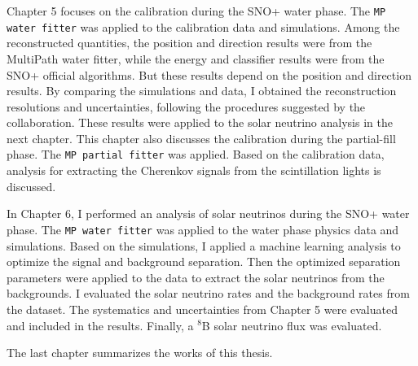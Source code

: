 Chapter 5 focuses on the calibration during the SNO+ water phase. The \texttt{MP water fitter} was applied to the calibration data and simulations. Among the reconstructed quantities, the position and direction results were from the MultiPath water fitter, while the energy and classifier results were from the SNO+ official algorithms. But these results depend on the position and direction results. By comparing the simulations and data, I obtained the reconstruction resolutions and uncertainties, following the procedures suggested by the collaboration. These results were applied to the solar neutrino analysis in the next chapter. This chapter also discusses the calibration during the partial-fill phase. The \texttt{MP partial fitter} was applied. Based on the calibration data, analysis for extracting the Cherenkov signals from the scintillation lights is discussed.

In Chapter 6, I performed an analysis of solar neutrinos during the SNO+ water phase. The \texttt{MP water fitter} was applied to the water phase physics data and simulations. Based on the simulations, I applied a machine learning analysis to optimize the signal and background separation. Then the optimized separation parameters were applied to the data to extract the solar neutrinos from the backgrounds. I evaluated the solar neutrino rates and the background rates from the dataset. The systematics and uncertainties from Chapter 5 were evaluated and included in the results. Finally, a $^8$B solar neutrino flux was evaluated.

The last chapter summarizes the works of this thesis.